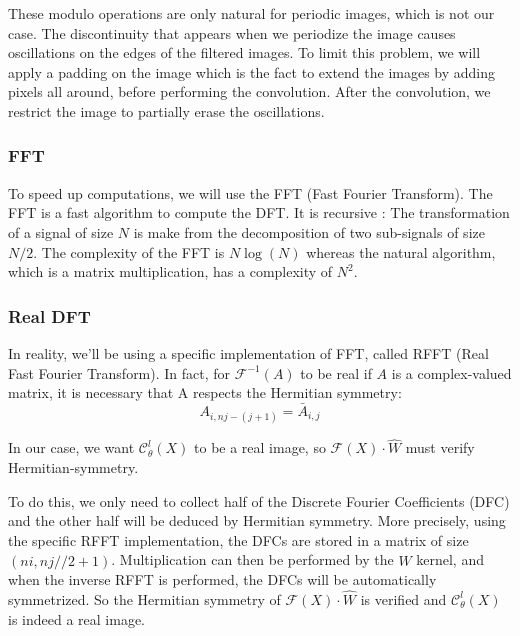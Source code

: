 \begin{Rem}
	These modulo operations are only natural for periodic images, which is not our case. The
	discontinuity that appears when we periodize the image causes oscillations on the edges of the filtered	images. To limit this problem, we will apply a padding on the image which is the fact to extend the images by adding pixels all around, before performing the convolution. After the convolution, we restrict the image to partially erase the oscillations.
\end{Rem}

\subsubsection{FFT}

To speed up computations, we will use the FFT (Fast Fourier Transform). The FFT is a fast algorithm to compute the DFT. It is recursive : The transformation of a signal of size $N$ is make from the decomposition of two sub-signals of size $N/2$. The complexity of the FFT is $N\log(N)$ whereas the natural algorithm, which is a matrix multiplication, has a complexity of $N^2$.

\subsubsection{Real DFT}

In reality, we'll be using a specific implementation of FFT, called RFFT (Real Fast Fourier Transform). In fact, for $\mathcal{F}^{-1}(A)$ to be real if $A$ is a complex-valued matrix, it is necessary that A respects the Hermitian symmetry:
\begin{equation*}
	A_{i,nj-(j+1)} = \bar{A}_{i,j}
\end{equation*}

In our case, we want $\mathcal{C}_\theta^l(X)$ to be a real image, so $\mathcal{F}(X)\cdot\hat{W}$ must verify Hermitian-symmetry.

To do this, we only need to collect half of the Discrete Fourier Coefficients (DFC) and the other half will be deduced by Hermitian symmetry. More precisely, using the specific RFFT implementation, the DFCs are stored in a matrix of size $(ni,nj//2+1)$. Multiplication can then be performed by the $\hat{W}$ kernel, and when the inverse RFFT is performed, the DFCs will be automatically symmetrized. So the Hermitian symmetry of $\mathcal{F}(X)\cdot\hat{W}$ is verified and $\mathcal{C}_\theta^l(X)$ is indeed a real image.

